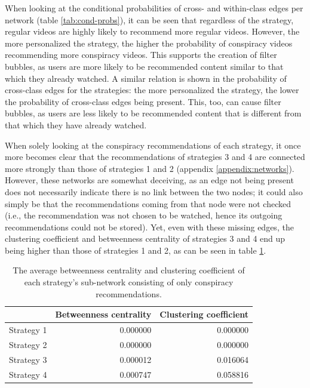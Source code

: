 \documentclass[../main.tex]{subfiles}
\begin{document}

When looking at the conditional probabilities of cross- and within-class edges per network (table 
\ref{tab:cond-probs}), it can be seen that regardless of the strategy, regular videos are highly likely to 
recommend more regular videos. However, the more personalized the strategy, the higher the probability of 
conspiracy videos recommending more conspiracy videos. This supports the creation of filter bubbles, as 
users are more likely to be recommended content similar to that which they already watched. A similar relation
is shown in the probability of cross-class edges for the strategies: the more personalized the strategy, the 
lower the probability of cross-class edges being present. This, too, can cause filter bubbles, as users are 
less likely to be recommended content that is different from that which they have already watched. 

When solely looking at the conspiracy recommendations of each strategy, it once more becomes clear that the 
recommendations of strategies 3 and 4 are connected more strongly than those of strategies 1 and 2 (appendix 
\ref{appendix:networks}). However, these networks are somewhat deceiving, as an edge not being present does not 
necessarily indicate there is no link between the two nodes; it could also simply be that the recommendations 
coming from that node were not checked (i.e., the recommendation was not chosen to be watched, hence its 
outgoing recommendations could not be stored). Yet, even with these missing edges, the clustering coefficient 
and betweenness centrality of strategies 3 and 4 end up being higher than those of strategies 1 and 2, as can be
seen in table \ref{tab:sub-net_metrics}. 

\begin{table}
\centering
\begin{tabular}{lrr}
\toprule
{} &  Betweenness centrality &  Clustering coefficient \\
\midrule
Strategy 1 &                0.000000 &                0.000000 \\
Strategy 2 &                0.000000 &                0.000000 \\
Strategy 3 &                0.000012 &                0.016064 \\
Strategy 4 &                0.000747 &                0.058816 \\
\bottomrule
\end{tabular}
\caption{\label{tab:sub-net_metrics} The average betweenness centrality and clustering coefficient of each strategy's sub-network consisting of only conspiracy recommendations.}
\end{table}
\end{document}
